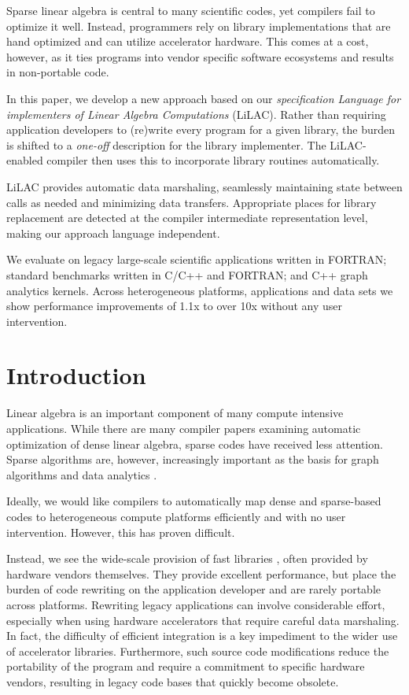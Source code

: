  
    Sparse linear algebra is central to many scientific codes,
    yet compilers fail to optimize it well.
    Instead, programmers rely on library implementations
    that are hand optimized and can utilize accelerator hardware.
    This comes at a cost, however, as it ties programs into vendor specific
    software ecosystems and results in non-portable code.

    In this paper, we develop a new approach based on our {\em
    specification Language for implementers of Linear Algebra
    Computations} (LiLAC).
    Rather than requiring application developers to (re)write every
    program for a given library, the burden is shifted to a
    {\em one-off} description for the library implementer.
    The LiLAC-enabled compiler then uses this to
    incorporate library routines automatically.

    LiLAC provides automatic data marshaling, seamlessly maintaining
    state between calls as needed and minimizing data transfers.
    Appropriate places for library replacement are detected at the compiler
     intermediate representation level, making  our approach
    language independent.

    We evaluate on legacy large-scale scientific applications written in FORTRAN;
    standard benchmarks written in C/C++ and FORTRAN; and C++ graph analytics kernels.
    Across heterogeneous platforms, applications and data sets we show performance
    improvements of 1.1x to over 10x without any user intervention.


\section{Introduction}

Linear algebra is an important component of many compute intensive
applications.  While there are many compiler papers examining
automatic optimization of dense linear algebra, sparse codes
have received less attention.  Sparse algorithms are, however,
increasingly important as the basis for graph algorithms and data
analytics \cite{Kepner2015GraphsMA}.

Ideally, we would like compilers to automatically map dense and sparse-based
codes to heterogeneous compute platforms efficiently and with no user
intervention. However,  this has proven difficult.

Instead, we see the wide-scale provision of fast libraries
\cite{cusparse,clsparse,mkl}, often provided by hardware vendors themselves.
They provide excellent performance, but place the burden of code rewriting on
the application developer and are rarely portable across platforms.
Rewriting legacy applications can involve considerable effort, especially when
using hardware accelerators that require careful data marshaling.
In fact, the difficulty of efficient integration is a key impediment to the
wider use of accelerator libraries.
Furthermore, such source code modifications reduce the portability of the
program and require a commitment to specific hardware vendors, resulting in legacy
code bases that quickly become obsolete.

